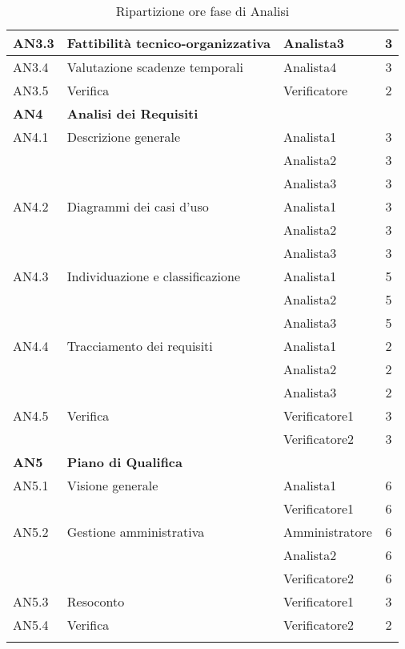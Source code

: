 \begin{longtable}{|l|l|l|c|}
      	{AN3.3} & {Fattibilità tecnico-organizzativa} & Analista3  & 3 \\
      	\hline
      	{AN3.4} & {Valutazione scadenze temporali} & Analista4  & 3 \\
      	\hline
      	{AN3.5} & {Verifica} & Verificatore  & 2 \\
      \hline
      \textbf{AN4} & \textbf{Analisi dei Requisiti} & &  \\
         \hline
         {AN4.1} & {Descrizione generale} & Analista1  &  3\\
         & & Analista2 & 3\\
         & & Analista3 & 3\\
         \hline
         {AN4.2} & {Diagrammi dei casi d'uso} & Analista1  &  3\\
         & & Analista2 & 3\\
         & & Analista3 & 3\\
         \hline
         {AN4.3} & {Individuazione e classificazione} & Analista1  &  5\\
         & & Analista2 & 5\\
         & & Analista3 & 5\\
         \hline
         {AN4.4} & {Tracciamento dei requisiti} & Analista1  &  2\\
         & & Analista2 & 2\\
         & & Analista3 & 2\\
         \hline
         {AN4.5} & {Verifica} & Verificatore1  &  3\\
         & & Verificatore2 & 3\\
     \hline
     \textbf{AN5} & \textbf{Piano di Qualifica} & &  \\
         \hline
         {AN5.1} & {Visione generale} & Analista1 &  6 \\
         & & Verificatore1 & 6\\
         \hline
         {AN5.2} & {Gestione amministrativa} & Amministratore  &  6\\
         & & Analista2 & 6\\
         & & Verificatore2 & 6\\
         \hline
         {AN5.3} & {Resoconto} & Verificatore1 &  3\\
         \hline
         {AN5.4} & {Verifica} & Verificatore2 &  2 \\
     \hline
     \caption{Ripartizione ore fase di Analisi}
\end{longtable}
\egroup
  

